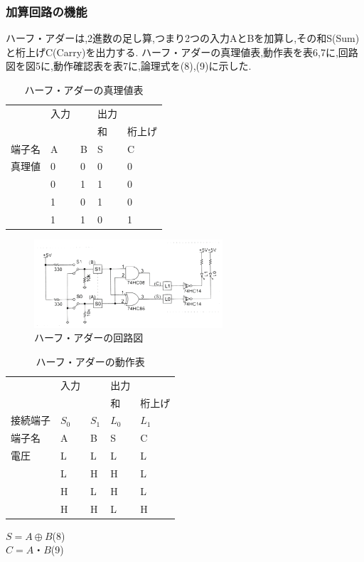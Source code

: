 \documentclass[twocolumn, 10pt,a4j]{jsarticle}
\begin{document}
  \subsubsection{加算回路の機能}
    ハーフ・アダーは,2進数の足し算,つまり2つの入力AとBを加算し,その和S(Sum)と桁上げC(Carry)を出力する.
    ハーフ・アダーの真理値表,動作表を表6,7に,回路図を図5に,動作確認表を表7に,論理式を(8),(9)に示した.
    \begin{table}[]
      \centering
      \caption{ハーフ・アダーの真理値表}
      \label{my-label}
      \footnotesize
      \begin{tabular}{l|ll|ll|}
          & 入力 &   & 出力 &     \\ \cline{4-5} 
          &  &   & 和  & 桁上げ \\ \hline
      端子名 & A  & B & S  & C   \\ \hline
      真理値 & 0  & 0 & 0  & 0   \\
          & 0  & 1 & 1  & 0   \\
          & 1  & 0 & 1  & 0   \\
          & 1  & 1 & 0  & 1  
      \end{tabular}
    \end{table}
    \begin{figure}[H]
      \begin{center}
        \includegraphics[width=7cm]{../img/half_adder/half_ader_kairo.png}
        \caption{ハーフ・アダーの回路図}
      \end{center}
    \end{figure}
    \begin{table}[H]
      \centering
      \caption{ハーフ・アダーの動作表}
      \label{my-label}
      \footnotesize
        \begin{tabular}{l|ll|ll|}
            & 入力      &         & 出力      &         \\ \cline{4-5} 
            &         &         & 和       & 桁上げ     \\ \hline
        接続端子 & $S_{0}$ & $S_{1}$ & $L_{0}$ & $L_{1}$ \\ \hline
        端子名  & A       & B       & S       & C       \\ \hline
        電圧   & L       & L       & L       & L       \\
            & L       & H       & H       & L       \\
            & H       & L       & H       & L       \\
            & H       & H       & L       & H      
        \end{tabular}
    \end{table}
    \begin{center}
      $S = A \oplus B$\quad(8) \\
      $C = A・B$\quad(9) \\  
    \end{center}
\end{document}
